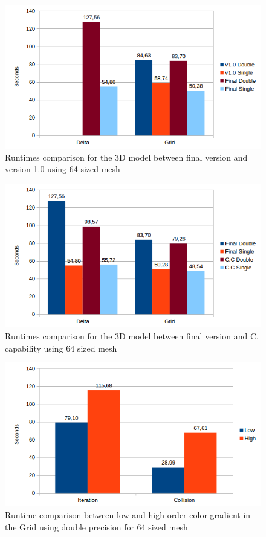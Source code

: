 \documentclass[12pt, openany]{book}
\begin{document}
        \begin{figure}[H]
        	\centering
        	\includegraphics[width=\linewidth]{Resources/Images/vfv3d64.png}
        	\caption{Runtimes comparison for the 3D model between final version and version 1.0 using 64 sized mesh}
        	\label{fig:vfv3d64}
        \end{figure}
            \begin{figure}[H]
            	\centering
            	\includegraphics[width=\linewidth]{Resources/Images/cc3d64.png}
            	\caption{Runtimes comparison for the 3D model between final version and C. capability using 64 sized mesh}
            	\label{fig:cc3d64}
            \end{figure}
            
              \begin{figure}[H]
              	\centering
              	\includegraphics[width=\linewidth]{Resources/Images/high64.png}
              	\caption{Runtime comparison between low and high order color gradient in the Grid using double precision for 64 sized mesh}
              	\label{fig:high64}
              \end{figure}
\end{document}
